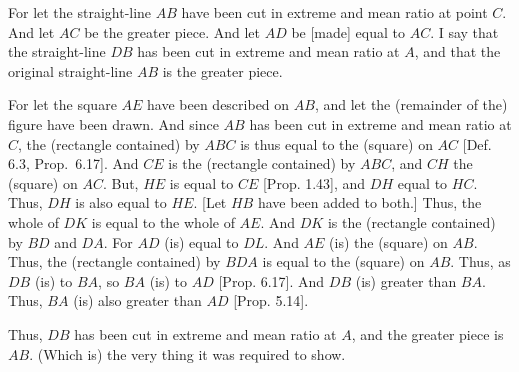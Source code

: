 \begin{Parallel}{}{}
{For let the straight-line $AB$ have been cut in extreme and mean ratio
at point $C$. And let $AC$ be the greater piece. And let $AD$
be [made] equal to $AC$. I say that the straight-line $DB$ has been cut in extreme and
mean ratio at $A$, and that the original straight-line $AB$ is
the greater piece.

For let the square $AE$ have been described on $AB$, and
let the (remainder of the) figure have been drawn. And since
$AB$ has been cut in extreme and mean ratio at $C$, the (rectangle
contained) by $ABC$ is thus equal to the (square) on $AC$
[Def. 6.3, Prop.~6.17].  And $CE$ is the (rectangle contained)
by  $ABC$,  and $CH$ the (square) on $AC$. But, $HE$ is equal
to $CE$ [Prop. 1.43], and $DH$ equal to $HC$. Thus, $DH$ is also
equal to $HE$. [Let $HB$ have been added to both.] Thus, the whole
of $DK$ is equal to the whole of $AE$. And $DK$ is the
(rectangle contained) by $BD$ and $DA$. For $AD$ (is) equal to
$DL$. And $AE$ (is) the (square) on $AB$.  Thus, the (rectangle
contained) by $BDA$ is equal to the (square) on $AB$. Thus, as
$DB$ (is) to $BA$, so $BA$ (is) to $AD$ [Prop. 6.17]. And
$DB$ (is) greater than $BA$. Thus, $BA$ (is) also greater
than $AD$ [Prop. 5.14].

Thus, $DB$ has been cut in extreme and mean ratio at $A$, and the
greater piece is $AB$. (Which is) the very thing it was required to show.}
\end{Parallel}

